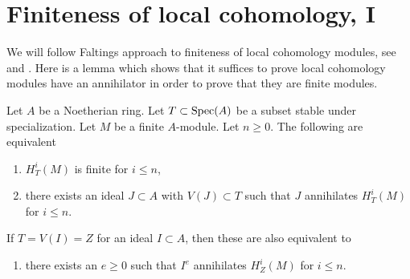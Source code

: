 \section{Finiteness of local cohomology, I}
\label{section-finiteness}

\noindent
We will follow Faltings approach to finiteness of local cohomology
modules, see \cite{Faltings-annulators} and \cite{Faltings-finiteness}.
Here is a lemma which shows that it suffices to prove
local cohomology modules have an annihilator in order to prove that
they are finite modules.

\begin{lemma}
\label{lemma-check-finiteness-local-cohomology-by-annihilator}
\begin{reference}
\cite[Lemma 3]{Faltings-annulators}
\end{reference}
Let $A$ be a Noetherian ring. Let $T \subset \mathop{\mathrm{Spec}}(A)$ be a subset stable
under specialization. Let $M$ be a finite $A$-module. Let $n \geq 0$.
The following are equivalent
\begin{enumerate}
\item $H^i_T(M)$ is finite for $i \leq n$,
\item there exists an ideal $J \subset A$ with $V(J) \subset T$
such that $J$ annihilates $H^i_T(M)$ for $i \leq n$.
\end{enumerate}
If $T = V(I) = Z$ for an ideal $I \subset A$, then these are also
equivalent to
\begin{enumerate}
\item[(3)] there exists an $e \geq 0$ such that $I^e$ annihilates
$H^i_Z(M)$ for $i \leq n$.
\end{enumerate}
\end{lemma}

